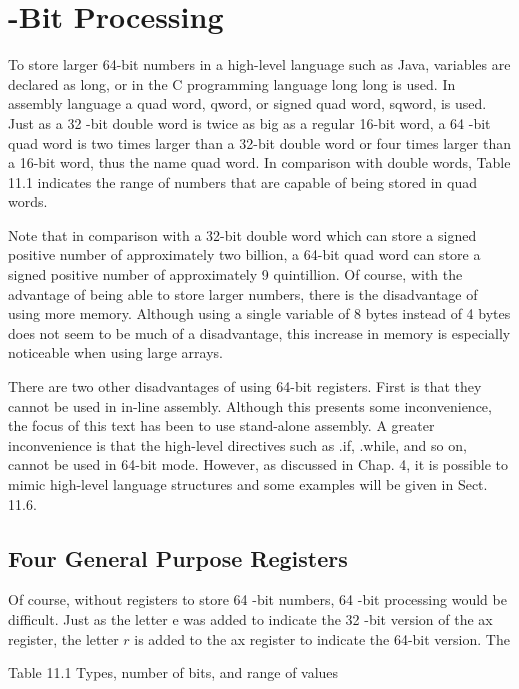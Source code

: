 \documentclass[10pt]{book}
\begin{document}
\section{-Bit Processing}
To store larger 64-bit numbers in a high-level language such as Java, variables are declared as long, or in the C programming language long long is used. In assembly language a quad word, qword, or signed quad word, sqword, is used. Just as a 32 -bit double word is twice as big as a regular 16-bit word, a 64 -bit quad word is two times larger than a 32-bit double word or four times larger than a 16-bit word, thus the name quad word. In comparison with double words, Table 11.1 indicates the range of numbers that are capable of being stored in quad words.


Note that in comparison with a 32-bit double word which can store a signed positive number of approximately two billion, a 64-bit quad word can store a signed positive number of approximately 9 quintillion. Of course, with the advantage of being able to store larger numbers, there is the disadvantage of using more memory. Although using a single variable of 8 bytes instead of 4 bytes does not seem to be much of a disadvantage, this increase in memory is especially noticeable when using large arrays.

There are two other disadvantages of using 64-bit registers. First is that they cannot be used in in-line assembly. Although this presents some inconvenience, the focus of this text has been to use stand-alone assembly. A greater inconvenience is that the high-level directives such as .if, .while, and so on, cannot be used in 64-bit mode. However, as discussed in Chap. 4, it is possible to mimic high-level language structures and some examples will be given in Sect. 11.6.

\subsection{Four General Purpose Registers}
Of course, without registers to store 64 -bit numbers, 64 -bit processing would be difficult. Just as the letter e was added to indicate the 32 -bit version of the ax register, the letter $r$ is added to the ax register to indicate the 64-bit version. The

Table 11.1 Types, number of bits, and range of values
\end{document}
